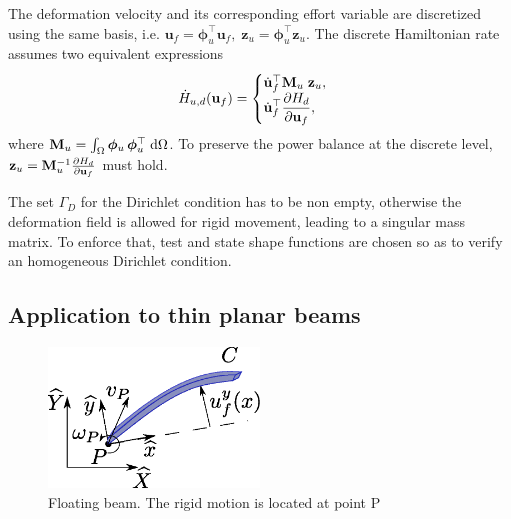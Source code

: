 \documentclass{svjour3}                     %
\begin{document}
The deformation velocity and its corresponding effort variable are discretized using the same basis, i.e. $\bm{u}_f = \bm{\phi}_u^\top \mathbf{u}_f, \; \bm{z}_u = \bm{\phi}_u^\top \mathbf{z}_u$. The discrete Hamiltonian rate assumes two equivalent expressions
\begin{equation*}
\dot{H}_{u, d}(\mathbf{u}_f) = 
\begin{cases}
\dot{\mathbf{u}}_f^\top \mathbf{M}_u \; \mathbf{z}_u, \\
\displaystyle \dot{\mathbf{u}}_f^\top \diffp{H_d}{\mathbf{u}_f},
\end{cases}
\end{equation*}
where $\mathbf{M}_u=\int_{\Omega} \bm{\phi}_u \, \bm{\phi}_u^\top \d{\Omega}$. To preserve the power balance at the discrete level, $ \mathbf{z}_u = \mathbf{M}_u^{-1} \diffp{H_d}{\mathbf{u}_f}$ must hold. \\

\begin{remark}\label{rmk:dirich}
	The set $\Gamma_D$ for the Dirichlet condition has to be non empty, otherwise the deformation field is allowed for rigid movement, leading to a singular mass matrix. To enforce that, test and state shape functions are chosen so as to verify an homogeneous Dirichlet condition. 
\end{remark}

\subsection{Application to thin planar beams}
\label{sec:ph_floatbeam}

\begin{figure}[t]
	\centering
	\includegraphics[width=0.5\textwidth]{beam.eps} 
	\caption{Floating beam. The rigid motion is located at point P}
	\label{fig:beam}
\end{figure}
\end{document}
